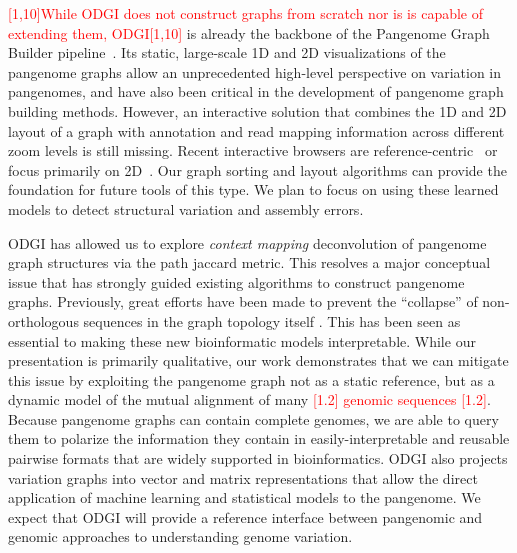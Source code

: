 \documentclass{bioinfo}
\newcommand{\REVIEWED}[1]{{\textcolor{Red}{#1}}}
\begin{document}
\REVIEWED{[1,10]While ODGI does not construct graphs from scratch nor is is capable of extending them, ODGI[1,10]} is already the backbone of the Pangenome Graph Builder pipeline~\citep{pggb}.
Its static, large-scale 1D and 2D visualizations of the pangenome graphs allow an unprecedented high-level perspective on variation in pangenomes, and have also been critical in the development of pangenome graph building methods.  %
However, an interactive solution that combines the 1D and 2D layout of a graph with annotation and read mapping information across different zoom levels is still missing.
Recent interactive browsers are reference-centric~\citep{Beyer2019, Yokoyama2019, Durant2021, Liang2021} or focus primarily on 2D~\citep{Wick_2015, Gonnella2018}.
Our graph sorting and layout algorithms can provide the foundation for future tools of this type.
We plan to focus on using these learned models to detect structural variation and assembly errors.

ODGI has allowed us to explore \textit{context mapping} deconvolution of pangenome graph structures via the path jaccard metric.
This resolves a major conceptual issue that has strongly guided existing algorithms to construct pangenome graphs.
Previously, great efforts have been made to prevent the ``collapse'' of non-orthologous sequences in the graph topology itself  \citep{Li:2020}.
This has been seen as essential to making these new bioinformatic models interpretable.
While our presentation is primarily qualitative, our work demonstrates that we can mitigate this issue by exploiting the pangenome graph not as a static reference, but as a dynamic model of the mutual alignment of many \REVIEWED{[1.2] genomic sequences [1.2]}.
Because pangenome graphs can contain complete genomes, we are able to query them to polarize the information they contain in easily-interpretable and reusable pairwise formats that are widely supported in bioinformatics.
ODGI also projects variation graphs into vector and matrix representations that allow the direct application of machine learning and statistical models to the pangenome.
We expect that ODGI will provide a reference interface between pangenomic and genomic approaches to understanding genome variation.
\end{document}
